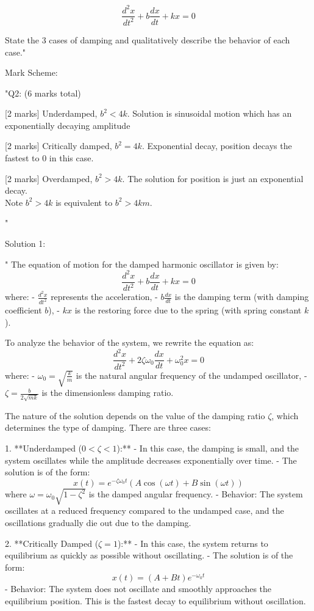 \[
\frac{d^{2}x}{dt^{2}} + b\frac{dx}{dt}+kx=0
\]

State the 3 cases of damping and qualitatively describe the behavior of each case."

Mark Scheme:

"{Q2: (6 marks total)}

[2 marks] Underdamped,  \( b^2 < 4k \). Solution is sinusoidal motion which has an exponentially decaying amplitude 

[2 marks] Critically damped, \( b^2 = 4k \). Exponential decay, position decays the fastest to 0 in this case. 

[2 marks] Overdamped, \( b^2 > 4k \). The solution for position is just an exponential decay. \\

Note \( b^2 > 4k \) is equivalent to \( b^2 > 4km \).

"

Solution 1: 

"
The equation of motion for the damped harmonic oscillator is given by:
\[
\frac{d^2x}{dt^2} + b\frac{dx}{dt} + kx = 0
\]
where:
- \( \frac{d^2x}{dt^2} \) represents the acceleration,
- \( b\frac{dx}{dt} \) is the damping term (with damping coefficient \( b \)),
- \( kx \) is the restoring force due to the spring (with spring constant \( k \)).

To analyze the behavior of the system, we rewrite the equation as:
\[
\frac{d^2x}{dt^2} + 2\zeta\omega_0\frac{dx}{dt} + \omega_0^2x = 0
\]
where:
- \( \omega_0 = \sqrt{\frac{k}{m}} \) is the natural angular frequency of the undamped oscillator,
- \( \zeta = \frac{b}{2\sqrt{mk}} \) is the dimensionless damping ratio.

The nature of the solution depends on the value of the damping ratio \( \zeta \), which determines the type of damping. There are three cases:

1. **Underdamped (\( 0 < \zeta < 1 \)):**
   - In this case, the damping is small, and the system oscillates while the amplitude decreases exponentially over time.
   - The solution is of the form:
     \[
     x(t) = e^{-\zeta\omega_0 t} \left( A \cos(\omega t) + B \sin(\omega t) \right)
     \]
     where \( \omega = \omega_0 \sqrt{1 - \zeta^2} \) is the damped angular frequency.
   - Behavior: The system oscillates at a reduced frequency compared to the undamped case, and the oscillations gradually die out due to the damping.

2. **Critically Damped (\( \zeta = 1 \)):**
   - In this case, the system returns to equilibrium as quickly as possible without oscillating.
   - The solution is of the form:
     \[
     x(t) = (A + Bt)e^{-\omega_0 t}
     \]
   - Behavior: The system does not oscillate and smoothly approaches the equilibrium position. This is the fastest decay to equilibrium without oscillation.

